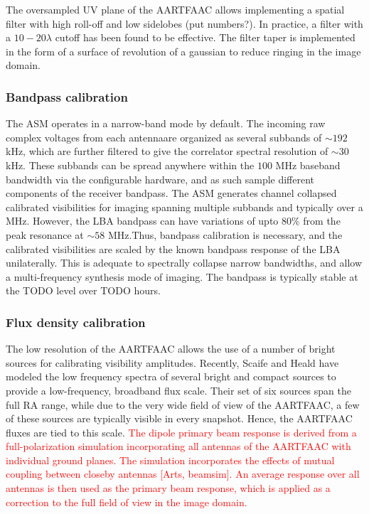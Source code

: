 \documentclass{aa}
\begin{document}
The oversampled UV plane of the AARTFAAC allows implementing a spatial
filter with high roll-off and low sidelobes (put numbers?). In practice,
a filter with a $10-20\lambda$ cutoff has been found to be effective.
The filter taper is implemented in the form of a surface of revolution
of a gaussian to reduce ringing in the image domain.


\subsubsection{Bandpass calibration}

The ASM operates in a narrow-band mode by default. The incoming raw
complex voltages from each antennaare organized as several subbands
of $\sim$$192$ kHz, which are further filtered to give the correlator
spectral resolution of $\sim$$30$ kHz. These subbands can be spread
anywhere within the $100$ MHz baseband bandwidth via the configurable
hardware, and as such sample different components of the receiver
bandpass. The ASM generates channel collapsed calibrated visibilities
for imaging spanning multiple subbands and typically over a MHz. However,
the LBA bandpass can have variations of upto 80\% from the peak resonance
at $\sim$$58$ MHz\cite{vanhaarlem2013lofar}.Thus, bandpass calibration
is necessary, and the calibrated visibilities are scaled by the known
bandpass response of the LBA unilaterally. This is adequate to spectrally
collapse narrow bandwidths, and allow a multi-frequency synthesis
mode of imaging. The bandpass is typically stable at the TODO level
over TODO hours.


\subsubsection{Flux density calibration}

The low resolution of the AARTFAAC allows the use of a number of bright
sources for calibrating visibility amplitudes. Recently, Scaife and
Heald\cite{scaife2012broad} have modeled the low frequency spectra
of several bright and compact sources to provide a low-frequency,
broadband flux scale. Their set of six sources span the full RA range,
while due to the very wide field of view of the AARTFAAC, a few of
these sources are typically visible in every snapshot. Hence, the
AARTFAAC fluxes are tied to this scale. \textcolor{red}{The dipole
primary beam response is derived from a full-polarization simulation
incorporating all antennas of the AARTFAAC with individual ground
planes. The simulation incorporates the effects of mutual coupling
between closeby antennas {[}Arts, beamsim{]}. An average response
over all antennas is then used as the primary beam response, which
is applied as a correction to the full field of view in the image
domain.}
\end{document}
